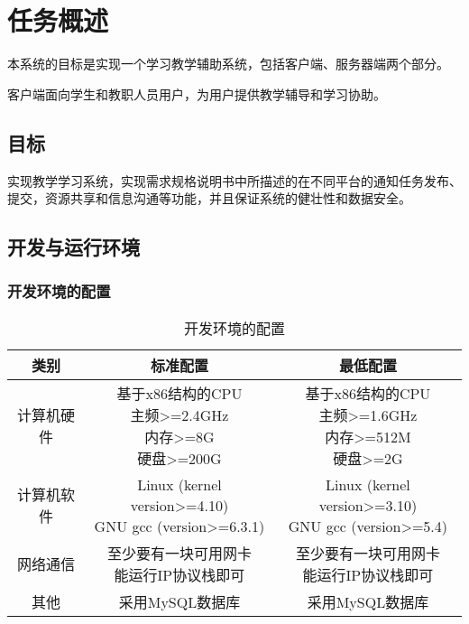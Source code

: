 \chapter{任务概述}
本系统的目标是实现一个学习教学辅助系统，包括客户端、服务器端两个部分。

客户端面向学生和教职人员用户，为用户提供教学辅导和学习协助。

\section{目标}
实现教学学习系统，实现需求规格说明书中所描述的在不同平台的通知任务发布、提交，资源共享和信息沟通等功能，并且保证系统的健壮性和数据安全。

\section{开发与运行环境}

\subsection{开发环境的配置}
\begin{table}[H]
\centering
\caption{开发环境的配置} \label{tab:development-environment}
\begin{tabular}{|c|c|c|}
    \hline
    类别 & 标准配置 & 最低配置 \\
    \hline
    计算机硬件 & \tabincell{c}{基于x86结构的CPU\\ 主频>=2.4GHz\\ 内存>=8G\\ 硬盘>=200G} & \tabincell{c}{基于x86结构的CPU\\ 主频>=1.6GHz\\ 内存>=512M\\ 硬盘>=2G} \\
    \hline
    计算机软件 & \tabincell{c}{Linux (kernel version>=4.10)\\ GNU gcc (version>=6.3.1)} & \tabincell{c}{Linux (kernel version>=3.10)\\ GNU gcc (version>=5.4)} \\
    \hline
    网络通信 & \tabincell{c}{至少要有一块可用网卡\\ 能运行IP协议栈即可} & \tabincell{c}{至少要有一块可用网卡\\ 能运行IP协议栈即可} \\
    \hline
    其他 & 采用MySQL数据库 & 采用MySQL数据库 \\
    \hline
\end{tabular}
\end{table}

